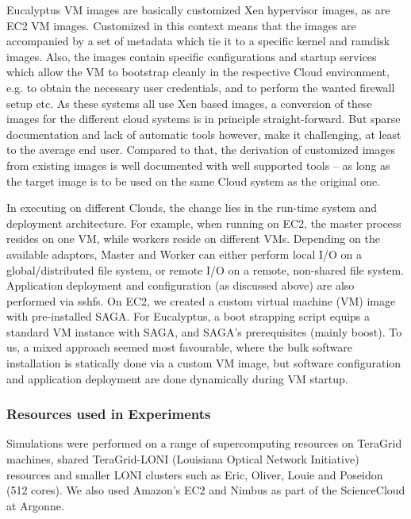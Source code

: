 \documentclass[3p,twocolumn]{elsarticle}
\begin{document}
 Eucalyptus VM images are basically customized
Xen hypervisor images, as are EC2 VM images.  Customized in this
context means that the images are accompanied by a set of metadata
which tie it to a specific kernel and ramdisk images.  Also, the
images contain specific configurations and startup services which
allow the VM to bootstrap cleanly in the respective Cloud environment,
e.g. to obtain the necessary user credentials, and to perform the
wanted firewall setup etc.  As these systems all use Xen based images,
a conversion of these images for the different cloud systems is in
principle straight-forward.  But sparse documentation and lack of
automatic tools however, make it challenging, at least to the average
end user. Compared to that, the derivation of customized images from
existing images is well documented with well supported tools -- as
long as the target image is to be used on the same Cloud system as the
original one.

In executing \sagamapreduce on different Clouds, the change lies in
the run-time system and deployment architecture. For example, when
running \sagamapreduce on EC2, the master process resides on one VM,
while workers reside on different VMs.  Depending on the available
adaptors, Master and Worker can either perform local I/O on a
global/distributed file system, or remote I/O on a remote, non-shared
file system.  %
Application deployment and configuration (as discussed above) are also
performed via sshfs.  On EC2, we created a custom virtual machine
(VM) image with pre-installed SAGA.  For Eucalyptus, a boot strapping
script equips a standard VM instance with SAGA, and SAGA's
prerequisites (mainly boost).  To us, a mixed approach seemed most
favourable, where the bulk software installation is statically done
via a custom VM image, but software configuration and application
deployment are done dynamically during VM startup.

\subsubsection{Resources used in Experiments}

Simulations were performed on a range of supercomputing resources on
TeraGrid machines, shared TeraGrid-LONI (Louisiana Optical Network
Initiative)~\cite{LONI_web} resources and smaller LONI clusters such
as Eric, Oliver, Louie and Poseidon (512 cores).  We also used
Amazon's EC2 and Nimbus as part of the ScienceCloud at Argonne.
\end{document}
